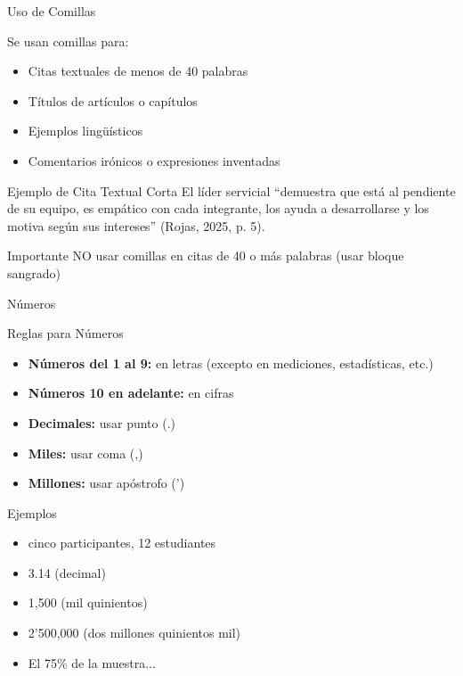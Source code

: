 \documentclass[spanish,aspectratio=169]{beamer}
\begin{document}
	\begin{frame}{Uso de Comillas}
		\begin{block}{Se usan comillas para:}
			\begin{itemize}
				\item Citas textuales de menos de 40 palabras
				\item Títulos de artículos o capítulos
				\item Ejemplos lingüísticos
				\item Comentarios irónicos o expresiones inventadas
			\end{itemize}
		\end{block}
		
		\begin{exampleblock}{Ejemplo de Cita Textual Corta}
			\small
			El líder servicial ``demuestra que está al pendiente de su equipo, es empático con cada integrante, los ayuda a desarrollarse y los motiva según sus intereses'' (Rojas, 2025, p. 5).
		\end{exampleblock}
		
		\begin{alertblock}{Importante}
			NO usar comillas en citas de 40 o más palabras (usar bloque sangrado)
		\end{alertblock}
	\end{frame}
	
	\begin{frame}{Números}
		\begin{block}{Reglas para Números}
			\begin{itemize}
				\item \textbf{Números del 1 al 9:} en letras (excepto en mediciones, estadísticas, etc.)
				\item \textbf{Números 10 en adelante:} en cifras
				\item \textbf{Decimales:} usar punto (.)
				\item \textbf{Miles:} usar coma (,)
				\item \textbf{Millones:} usar apóstrofo (')
			\end{itemize}
		\end{block}
		
		\begin{exampleblock}{Ejemplos}
			\begin{itemize}
				\item cinco participantes, 12 estudiantes
				\item 3.14 (decimal)
				\item 1,500 (mil quinientos)
				\item 2'500,000 (dos millones quinientos mil)
				\item El 75\% de la muestra...
			\end{itemize}
		\end{exampleblock}
	\end{frame}
	
\end{document}
